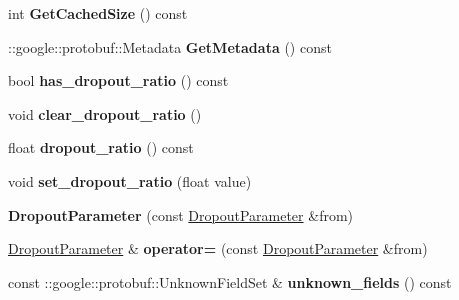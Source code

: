\begin{DoxyCompactItemize}
int {\bfseries Get\+Cached\+Size} () const
\item 
\mbox{\label{classcaffe_1_1_dropout_parameter_a05db2c9c10a8f52e89ef03ad0bd41f94}} 
\+::google\+::protobuf\+::\+Metadata {\bfseries Get\+Metadata} () const
\item 
\mbox{\label{classcaffe_1_1_dropout_parameter_a3b46d99f2987c082a1d8e9c1042e360c}} 
bool {\bfseries has\+\_\+dropout\+\_\+ratio} () const
\item 
\mbox{\label{classcaffe_1_1_dropout_parameter_ad9609722d6e3589fb8285204e91aa828}} 
void {\bfseries clear\+\_\+dropout\+\_\+ratio} ()
\item 
\mbox{\label{classcaffe_1_1_dropout_parameter_aeb58e6f1cad89ae058c4d30f05253c82}} 
float {\bfseries dropout\+\_\+ratio} () const
\item 
\mbox{\label{classcaffe_1_1_dropout_parameter_ab03810ccf6de9f261d8240c107ab4318}} 
void {\bfseries set\+\_\+dropout\+\_\+ratio} (float value)
\item 
\mbox{\label{classcaffe_1_1_dropout_parameter_a8f508117115113eba227ba9010d27746}} 
{\bfseries Dropout\+Parameter} (const \mbox{\hyperlink{classcaffe_1_1_dropout_parameter}{Dropout\+Parameter}} \&from)
\item 
\mbox{\label{classcaffe_1_1_dropout_parameter_a937af3b546195149d21f6d2be2eab63d}} 
\mbox{\hyperlink{classcaffe_1_1_dropout_parameter}{Dropout\+Parameter}} \& {\bfseries operator=} (const \mbox{\hyperlink{classcaffe_1_1_dropout_parameter}{Dropout\+Parameter}} \&from)
\item 
\mbox{\label{classcaffe_1_1_dropout_parameter_a6afdc3344a6d36ef3f03377a8ad1dc6f}} 
const \+::google\+::protobuf\+::\+Unknown\+Field\+Set \& {\bfseries unknown\+\_\+fields} () const
\item 
\mbox{\label{classcaffe_1_1_dropout_parameter_a2fd73b3fd0fe0371cd26479a256062a7}} 

\end{DoxyCompactItemize}
